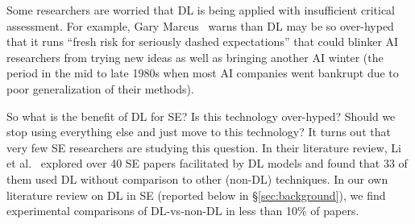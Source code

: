 \documentclass[10pt,compsoc,twocolumn]{IEEEtran}
\begin{document}
Some researchers are worried that DL is being applied with insufficient critical assessment. 
For example, Gary Marcus~\cite{marcus2018deep} 
warns than DL may be so over-hyped that it runs  ``fresh risk for seriously dashed expectations'' that could blinker AI researchers from trying new ideas as well as
bringing  another AI winter (the period in the mid to late 1980s when most AI companies went bankrupt due to poor generalization
of their methods).


So what is the benefit of DL for SE? Is this technology over-hyped? Should we stop using everything else and just move to this technology?
It turns out that very few SE researchers are studying this question.
In their literature review, Li et al.~\cite{li2018deep} explored over 40 SE papers facilitated by DL models and found that 33 of them used  DL without comparison to   other (non-DL) techniques. 
In our own literature review on DL in SE (reported below in \S\ref{sec:background}), we       find    experimental
comparisons of DL-vs-non-DL in  less than 10\% of    papers.
\end{document}
